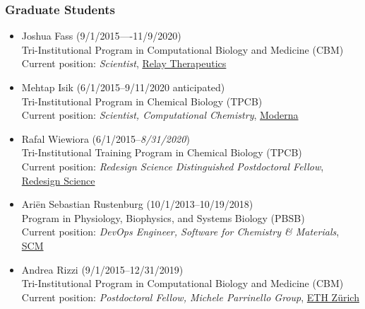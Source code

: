 \documentclass[10pt]{article}
\begin{document}
\subsubsection*{Graduate Students}

\begin{itemize}

  \item Joshua Fass (9/1/2015----11/9/2020)\\
  Tri-Institutional Program in Computational Biology and Medicine (CBM)\\
  Current position: \emph{Scientist}, \href{https://relaytx.com/}{Relay Therapeutics}
  
  \item Mehtap Isik (6/1/2015--9/11/2020 anticipated)\\
  Tri-Institutional Program in Chemical Biology (TPCB)\\
  Current position: \emph{Scientist, Computational Chemistry}, \href{https://www.modernatx.com/}{Moderna}
  
  \item Rafal Wiewiora (6/1/2015--\emph{8/31/2020})\\
  Tri-Institutional Training Program in Chemical Biology (TPCB)\\
  Current position: \emph{Redesign Science Distinguished Postdoctoral Fellow}, \href{redesignscience.com}{Redesign Science}
  
  \item Ari\"{e}n Sebastian Rustenburg (10/1/2013--10/19/2018)\\
  Program in Physiology, Biophysics, and Systems Biology (PBSB)\\
  Current position: \emph{DevOps Engineer, Software for Chemistry \& Materials}, \href{https://www.scm.com/}{SCM}

  \item Andrea Rizzi (9/1/2015--12/31/2019)\\
  Tri-Institutional Program in Computational Biology and Medicine (CBM)\\
  Current position: \emph{Postdoctoral Fellow, Michele Parrinello Group}, \href{https://parrinello.ethz.ch/}{ETH Z\"urich}


\end{itemize}
\end{document}
